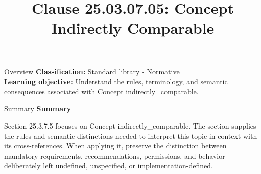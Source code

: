 \documentclass[10pt,letterpaper]{article}
\title{Clause 25.03.07.05: Concept Indirectly Comparable}
\author{}
\date{}
\begin{document}
\maketitle
\begin{CornellOverviewBox}{Overview}
\textbf{Classification:} Standard library - Normative\\[2pt]
\textbf{Learning objective:} Understand the rules, terminology, and semantic consequences associated with Concept indirectly\_comparable.
\end{CornellOverviewBox}\begin{CornellSummaryBox}{Summary}
{\sffamily\bfseries\color{Accent} Summary}\par\vspace{3pt}Section 25.3.7.5 focuses on Concept indirectly\_comparable. The section supplies the rules and semantic distinctions needed to interpret this topic in context with its cross-references. When applying it, preserve the distinction between mandatory requirements, recommendations, permissions, and behavior deliberately left undefined, unspecified, or implementation-defined.
\end{CornellSummaryBox}
\end{document}
